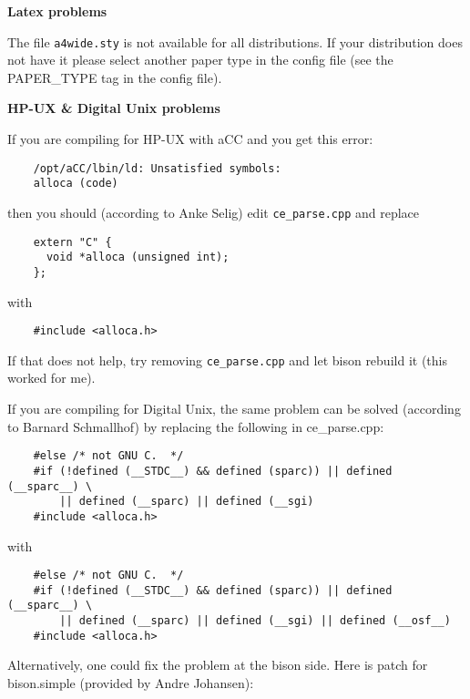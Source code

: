 {\bf Latex problems}

The file {\tt a4wide.sty} is not available for all distributions. If your distribution does not have it please select another paper type in the config file (see the PAPER\_\-TYPE tag in the config file).

{\bf HP-UX \& Digital Unix problems}

If you are compiling for HP-UX with a\-CC and you get this error: 

\footnotesize\begin{verbatim}
    /opt/aCC/lbin/ld: Unsatisfied symbols:
    alloca (code)
\end{verbatim}
\normalsize
then you should (according to Anke Selig) edit {\tt ce\_\-parse.cpp} and replace 

\footnotesize\begin{verbatim}
    extern "C" {
      void *alloca (unsigned int);
    };
\end{verbatim}
\normalsize
with 

\footnotesize\begin{verbatim}
    #include <alloca.h>  
\end{verbatim}
\normalsize


If that does not help, try removing {\tt ce\_\-parse.cpp} and let bison rebuild it (this worked for me).

If you are compiling for Digital Unix, the same problem can be solved (according to Barnard Schmallhof) by replacing the following in ce\_\-parse.cpp:



\footnotesize\begin{verbatim}
    #else /* not GNU C.  */
    #if (!defined (__STDC__) && defined (sparc)) || defined (__sparc__) \
        || defined (__sparc) || defined (__sgi)
    #include <alloca.h>
\end{verbatim}
\normalsize


with



\footnotesize\begin{verbatim}
    #else /* not GNU C.  */
    #if (!defined (__STDC__) && defined (sparc)) || defined (__sparc__) \
        || defined (__sparc) || defined (__sgi) || defined (__osf__)
    #include <alloca.h>
\end{verbatim}
\normalsize


Alternatively, one could fix the problem at the bison side. Here is patch for bison.simple (provided by Andre Johansen):



